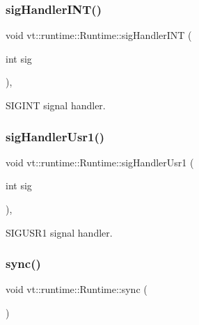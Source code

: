 \subsubsection{\texorpdfstring{sig\+Handler\+I\+N\+T()}{sigHandlerINT()}}
{\footnotesize\ttfamily void vt\+::runtime\+::\+Runtime\+::sig\+Handler\+I\+NT (\begin{DoxyParamCaption}\item[{int}]{sig }\end{DoxyParamCaption})\hspace{0.3cm}{\ttfamily [static]}, {\ttfamily [protected]}}



S\+I\+G\+I\+NT signal handler. 

\mbox{\label{structvt_1_1runtime_1_1_runtime_a833f09083e671080fb8ae1a44bc50321}} 
\subsubsection{\texorpdfstring{sig\+Handler\+Usr1()}{sigHandlerUsr1()}}
{\footnotesize\ttfamily void vt\+::runtime\+::\+Runtime\+::sig\+Handler\+Usr1 (\begin{DoxyParamCaption}\item[{int}]{sig }\end{DoxyParamCaption})\hspace{0.3cm}{\ttfamily [static]}, {\ttfamily [protected]}}



S\+I\+G\+U\+S\+R1 signal handler. 

\mbox{\label{structvt_1_1runtime_1_1_runtime_a92fe07cb78904559dfc21de68018fb53}} 
\subsubsection{\texorpdfstring{sync()}{sync()}}
{\footnotesize\ttfamily void vt\+::runtime\+::\+Runtime\+::sync (\begin{DoxyParamCaption}{ }\end{DoxyParamCaption})\hspace{0.3cm}{\ttfamily [protected]}}




